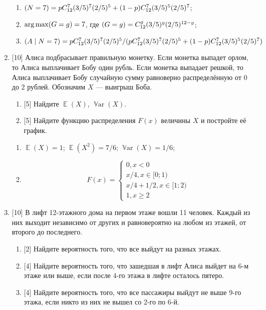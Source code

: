 \documentclass[12pt]{article}
\DeclareMathOperator{\Var}{\mathbb{V}ar}
\let\P\relax
\DeclareMathOperator{\P}{\mathbb{P}}
\DeclareMathOperator{\E}{\mathbb{E}}
\begin{document}
\begin{enumerate}
\begin{enumerate}
        \item $\P(N = 7) = p C_{12}^7 (3/5)^7 (2/5)^5 + (1 - p) C_{12}^7 (3/5)^5 (2/5)^7$;
        \item $\arg\max \P(G = g) = 7$, где $\P(G = g) = C_{12}^g (3/5)^g (2/5)^{12-g}$;
        \item $\P(A \mid N= 7) =  p C_{12}^7 (3/5)^7 (2/5)^5 / (p C_{12}^7 (3/5)^7 (2/5)^5 + (1 - p) C_{12}^7 (3/5)^5 (2/5)^7)$
    \end{enumerate}


    

    \item {[10]} Алиса подбрасывает правильную монетку. Если монетка выпадет орлом, то Алиса выплачивает Бобу один рубль. 
    Если монетка выпадает решкой, то Алиса выплачивает Бобу случайную сумму равноверно распределённую от $0$ до $2$ рублей. 
    Обозначим $X$ — выигрыш Боба.
    \begin{enumerate}
        \item {[5]} Найдите $\E(X)$, $\Var(X)$.
        \item {[5]} Найдите функцию распределения $F(x)$ величины $X$ и постройте её график.
    \end{enumerate}

    \begin{enumerate}
        \item $\E(X) = 1$; $\E(X^2) = 7/6$; $\Var(X) = 1/6$;
        \item     
        \[
            F(x) = \begin{cases}
                0, x < 0 \\
                x/4, x \in [0;1) \\
                x/4 + 1/2, x \in [1;2) \\
                1, x \geq 2
            \end{cases}
        \]
    
    \end{enumerate}
    




    \item {[10]} В лифт 12-этажного дома на первом этаже вошли 11 человек. 
    Каждый из них выходит независимо от других и равновероятно на любом из этажей, от второго до последнего. 
    \begin{enumerate}
        \item {[2]} Найдите вероятность того, что все выйдут на разных этажах.
        \item {[4]} Найдите вероятность того, что зашедшая в лифт Алиса выйдет на 6-м этаже или выше, если после 4-го этажа в лифте осталось пятеро.
        \item {[4]} Найдите вероятность того, что все пассажиры выйдут не выше 9-го этажа, если никто из них не вышел со 2-го по 6-й.
    \end{enumerate}


\end{enumerate}
\end{document}
